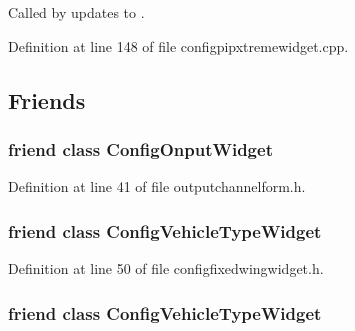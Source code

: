 \-Called by updates to . 



\-Definition at line 148 of file configpipxtremewidget.\-cpp.



\subsection{\-Friends}
\hypertarget{group___config_plugin_ga92a68401074780ed6cadf27f127892e3}{
\subsubsection[{\-Config\-Onput\-Widget}]{\setlength{\rightskip}{0pt plus 5cm}friend class \-Config\-Onput\-Widget}}\label{group___config_plugin_ga92a68401074780ed6cadf27f127892e3}


\-Definition at line 41 of file outputchannelform.\-h.

\hypertarget{group___config_plugin_gaf1f904d5df6619518f3228b2d5d238d0}{
\subsubsection[{\-Config\-Vehicle\-Type\-Widget}]{\setlength{\rightskip}{0pt plus 5cm}friend class {\bf \-Config\-Vehicle\-Type\-Widget}}}\label{group___config_plugin_gaf1f904d5df6619518f3228b2d5d238d0}


\-Definition at line 50 of file configfixedwingwidget.\-h.

\hypertarget{group___config_plugin_gaf1f904d5df6619518f3228b2d5d238d0}{
\subsubsection[{\-Config\-Vehicle\-Type\-Widget}]{\setlength{\rightskip}{0pt plus 5cm}friend class {\bf \-Config\-Vehicle\-Type\-Widget}}}\label{group___config_plugin_gaf1f904d5df6619518f3228b2d5d238d0}


